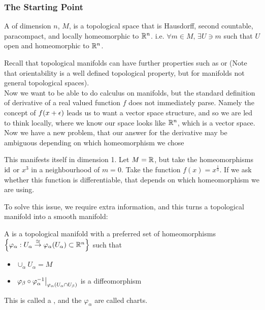 \documentclass{article}
\begin{document}
\subsubsection{The Starting Point}
\begin{definition}
A  of dimension $n$, $M$, is a topological space that is Hausdorff, second countable, paracompact, and locally homeomorphic to $\mathbb{R}^n$. i.e. $\forall m \in M, \, \exists U \ni m$ such that $U$ open and homeomorphic to $\mathbb{R}^n$. 
\end{definition}
Recall that topological manifolds can have further properties such as  or  (Note that orientability is a well defined topological property, but for manifolds not general topological spaces). \\
Now we want to be able to do calculus on manifolds, but the standard definition of derivative of a real valued function $f$ does not immediately parse. Namely the concept of $f(x+\epsilon)$ leads us to want a vector space structure, and so we are led to think locally, where we know our space looks like $\mathbb{R}^n$, which is a vector space. Now we have a new problem, that our answer for the derivative may be ambiguous depending on which homeomorphism we chose 
\begin{example}
This manifests itself in dimension 1. Let $M = \mathbb{R}$, but take the homeomorphisms $\operatorname{id}$ or $x^3$ in a neighbourhood of $m=0$. Take the function $f(x) = x^\frac{1}{3}$. If we ask whether this function is differentiable, that depends on which homeomorphism we are using. 
\end{example}
To solve this issue, we require extra information, and this turns a topological manifold into a smooth manifold:

\begin{definition}
A  is a topological manifold with a preferred set of homeomorphisms $\left\{ \varphi_\alpha: U_\alpha \overset{\cong}{\to} \varphi_\alpha(U_\alpha) \subset \mathbb{R}^n \right\}$ such that 
\begin{itemize}
    \item $\cup_\alpha U_\alpha = M$
    \item $\left. \varphi_\beta \circ \varphi_\alpha^{-1} \right\rvert_{\varphi_\alpha(U_\alpha \cap U_\beta)}$ is a diffeomorphism
\end{itemize}
This is called a , and the $\varphi_\alpha$ are called charts. 
\end{definition}
\end{document}
